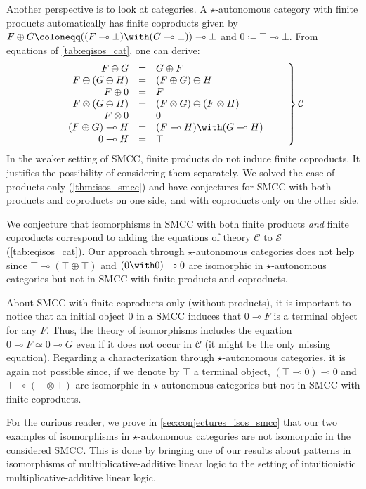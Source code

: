 \documentclass{lmcs}
\newcommand*{\tens}{\otimes} %
\newcommand*{\lolipop}{\multimap} %
\newcommand*{\iso}{\mathrel{\simeq}} %
\newcommand*{\thS}{\mathcal{S}}
\newcommand*{\thCP}{\mathcal{C}}
\begin{document}
Another perspective is to look at categories.
A $\star$-autonomous category with finite products automatically has finite coproducts given by $F\oplus G \coloneqq ((F\lolipop\bot)\with(G\lolipop\bot))\lolipop\bot$ and $0 \coloneqq \top\lolipop\bot$.
From equations of \autoref{tab:eqisos_cat}, one can derive:
\begin{equation*}
\left.\begin{array}{rcl}
  F\oplus G &=& G\oplus F \\
  F\oplus (G\oplus H) &=& (F\oplus G)\oplus H \\
  F\oplus 0 &=& F \\
  F\tens(G\oplus H) &=& (F\tens G)\oplus(F\tens H) \\
  F\tens 0 &=& 0 \\
  (F\oplus G)\lolipop H &=& (F\lolipop H)\with(G\lolipop H) \\
  0\lolipop H &=& \top
\end{array}\qquad\right\}\thCP
\end{equation*}
In the weaker setting of SMCC, finite products do not induce finite coproducts.
It justifies the possibility of considering them separately.
We solved the case of products only (\autoref{thm:isos_smcc}) and have conjectures for SMCC with both products and coproducts on one side, and with coproducts only on the other side.

We conjecture that isomorphisms in SMCC with both finite products \emph{and} finite coproducts correspond to adding the equations of theory $\thCP$ to $\thS$ (\autoref{tab:eqisos_cat}).
Our approach through $\star$-autonomous categories does not help since $\top\lolipop(\top\oplus\top)$ and $(0\with 0)\lolipop 0$ are isomorphic in $\star$-autonomous categories but not in SMCC with finite products and coproducts.

About SMCC with finite coproducts only (without products), it is important to notice that an initial object $0$ in a SMCC induces that $0\lolipop F$ is a terminal object for any $F$.
Thus, the theory of isomorphisms includes the equation $0\lolipop F\iso 0\lolipop G$ even if it does not occur in $\thCP$ (it might be the only missing equation).
Regarding a characterization through $\star$-autonomous categories, it is again not possible since, if we denote by $\top$ a terminal object, $(\top\lolipop 0)\lolipop 0$ and $\top\lolipop(\top\tens\top)$ are isomorphic in $\star$-autonomous categories but not in SMCC with finite coproducts.

For the curious reader, we prove in \autoref{sec:conjectures_isos_smcc} that our two examples of isomorphisms in $\star$-autonomous categories are not isomorphic in the considered SMCC.
This is done by bringing one of our results about patterns in isomorphisms of multiplicative-additive linear
logic to the setting of intuitionistic multiplicative-additive linear logic.
\end{document}
